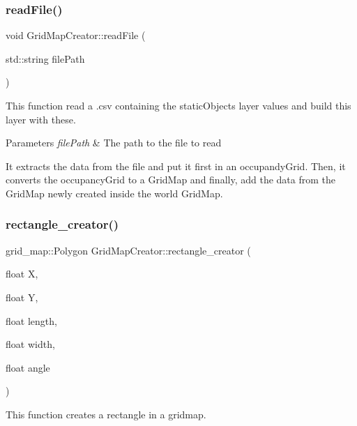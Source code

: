 \subsubsection{\texorpdfstring{read\+File()}{readFile()}}
{\footnotesize\ttfamily void Grid\+Map\+Creator\+::read\+File (\begin{DoxyParamCaption}\item[{std\+::string}]{file\+Path }\end{DoxyParamCaption})\hspace{0.3cm}{\ttfamily [inline]}}



This function read a .csv containing the static\+Objects layer values and build this layer with these. 


\begin{DoxyParams}{Parameters}
{\em file\+Path} & The path to the file to read\\
\hline
\end{DoxyParams}
It extracts the data from the file and put it first in an occupandy\+Grid. Then, it converts the occupancy\+Grid to a Grid\+Map and finally, add the data from the Grid\+Map newly created inside the world Grid\+Map. \mbox{\label{classGridMapCreator_a539fd0f37ec502def07c5cd2d83402eb}} 
\subsubsection{\texorpdfstring{rectangle\+\_\+creator()}{rectangle\_creator()}}
{\footnotesize\ttfamily grid\+\_\+map\+::\+Polygon Grid\+Map\+Creator\+::rectangle\+\_\+creator (\begin{DoxyParamCaption}\item[{float}]{X,  }\item[{float}]{Y,  }\item[{float}]{length,  }\item[{float}]{width,  }\item[{float}]{angle }\end{DoxyParamCaption})\hspace{0.3cm}{\ttfamily [inline]}}



This function creates a rectangle in a gridmap. 


